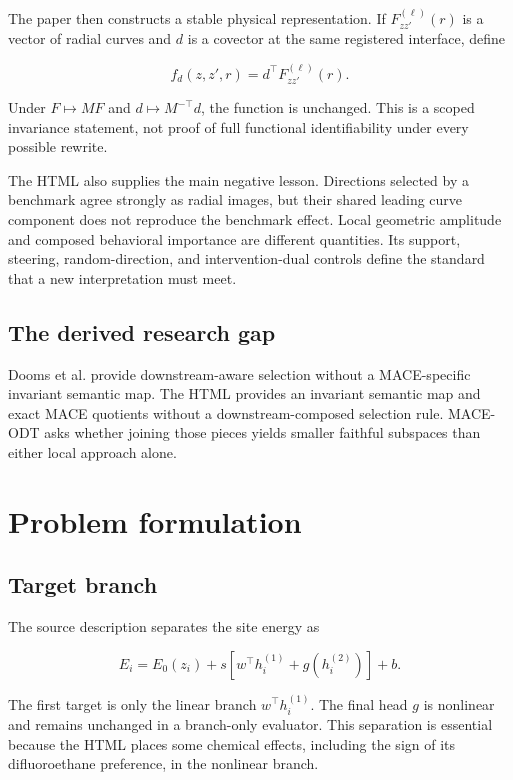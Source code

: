 \documentclass[10pt,twocolumn]{article}
\begin{document}
The paper then constructs a stable physical representation. If $F_{zz'}^{(\ell)}(r)$ is a vector of radial curves and $d$ is a covector at the same registered interface, define

\begin{equation}
f_d(z,z',r)=d^\top F_{zz'}^{(\ell)}(r).
\label{eq:image}
\end{equation}

Under $F\mapsto MF$ and $d\mapsto M^{-\top}d$, the function is unchanged. This is a scoped invariance statement, not proof of full functional identifiability under every possible rewrite.

The HTML also supplies the main negative lesson. Directions selected by a benchmark agree strongly as radial images, but their shared leading curve component does not reproduce the benchmark effect. Local geometric amplitude and composed behavioral importance are different quantities. Its support, steering, random-direction, and intervention-dual controls define the standard that a new interpretation must meet.

\subsection{The derived research gap}

Dooms et al. provide downstream-aware selection without a MACE-specific invariant semantic map. The HTML provides an invariant semantic map and exact MACE quotients without a downstream-composed selection rule. MACE-ODT asks whether joining those pieces yields smaller faithful subspaces than either local approach alone.

\section{Problem formulation}

\subsection{Target branch}

The source description separates the site energy as

\begin{equation}
E_i=E_0(z_i)+s\left[w^\top h_i^{(1)}+g(h_i^{(2)})\right]+b.
\label{eq:readout}
\end{equation}

The first target is only the linear branch $w^\top h_i^{(1)}$. The final head $g$ is nonlinear and remains unchanged in a branch-only evaluator. This separation is essential because the HTML places some chemical effects, including the sign of its difluoroethane preference, in the nonlinear branch.
\end{document}
